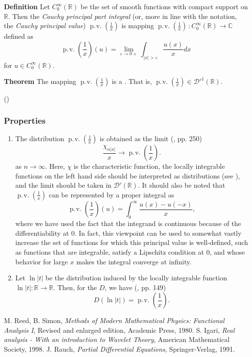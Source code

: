 \documentclass[12pt]{article}
\newcommand{\sR}[0]{\mathbb{R}}
\newcommand{\sC}[0]{\mathbb{C}}
\begin{document}
\newcommand{\cpv}[0]{\operatorname{p.\!v.}(\frac{1}{x})}
\newcommand{\cD}[0]{\mathcal{D}}
\newcommand{\supp}[0]{\operatorname{supp}}

{\bf Definition} \cite{reed, igari, rauch} 
Let $C_0^\infty(\sR)$ be the set of smooth functions with compact support on $\sR$. 
Then the \emph{Cauchy principal part integral} (or, more in line with the notation, the \emph{Cauchy principal value}) $\cpv $ 
is mapping $\cpv \,: C_0^\infty(\sR) \to  \sC$ defined as
$$\cpv (u)=\lim_{\varepsilon\to 0+} \int_{|x|>\varepsilon} \frac{u(x)}{x} dx$$
for $u\in C_0^\infty(\sR)$. 

{\bf Theorem} The mapping $\cpv$
is a . 
That is, $\cpv \in \cD'^1(\sR)$. 

()

\subsubsection{Properties}
\begin{enumerate}
\item The distribution $\cpv$ is obtained as the limit (\cite{rauch}, pp. 250)
$$ \frac{\chi_{n |x|}}{x} \to \cpv. $$
as $n\to \infty$.
Here, $\chi$ is the characteristic function, 
the locally integrable functions on the left hand side 
should be interpreted as distributions
(see ), 
and the limit should be taken in $\cD'(\sR)$.  It should also be noted that $\cpv$ can be represented by a proper integral as
$$ \cpv(u)=\int_0^\infty \frac{u(x)-u(-x)}{x},$$ where we have used the fact that the integrand is continuous because of the differentiability at 0.  In fact, this viewpoint can be used to somewhat vastly increase the set of functions for which this principal value is well-defined, such as functions that are integrable, satisfy a Lipschitz condition at 0, and whose behavior for large $x$ makes the integral converge at infinity.
\item Let $\ln |t|$ be the distribution induced by the 
locally integrable function $\ln |t| : \sR\to \sR$. Then, 
for the  $D$, 
we have  (\cite{igari}, pp. 149)
$$ D (\ln |t|) = \cpv.$$
\end{enumerate}

\begin{thebibliography}{9}
 M. Reed, B. Simon,
  \emph{Methods of Modern Mathematical Physics: Functional Analysis I},
Revised and enlarged edition,  Academic Press, 1980. 
 S. Igari, \emph{Real analysis - With an introduction to Wavelet Theory}, American Mathematical Society, 1998.
 J. Rauch,
 \emph{Partial Differential Equations}, Springer-Verlag, 1991.
 \end{thebibliography}
\end{document}

